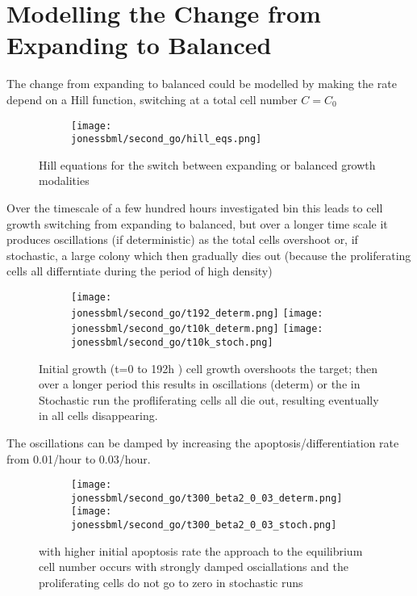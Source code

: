 \documentclass[a4paper,10pt]{report}
\newcommand{\psortbase}{/home/ngrs2/work/bsu/PSORT_Zuliani_Reynolds/}
\newcommand{\sbmlbase}{\psortbase/sbml-sh/}
\newcommand{\jonessbml}{\sbmlbase/jones_like}
\begin{document}
\section{Modelling the Change from Expanding to Balanced}

The change from expanding to balanced could be modelled by making the rate
depend on a Hill function, switching at a total cell number $C=C_0$

\begin{figure}[h!]
  \begin{subfigure}{\textwidth}
    \texttt{[image: \\jonessbml/second\_go/hill\_eqs.png]}
  \end{subfigure}
  \caption{Hill equations for the switch between expanding or balanced growth modalities}
  \label{fig:joneslike_hilleq}
\end{figure}

Over the timescale of a few hundred hours investigated bin \cite{roshan2016human} this leads to cell growth switching from expanding to balanced, but over a longer time scale it produces oscillations (if deterministic)  as the total cells overshoot or, if stochastic, a large colony which then gradually dies out (because the proliferating cells all differntiate during the period of high density)

\begin{figure}[h!]
  \begin{subfigure}{\textwidth}
    \texttt{[image: \\jonessbml/second\_go/t192\_determ.png]}
    \texttt{[image: \\jonessbml/second\_go/t10k\_determ.png]}
    \texttt{[image: \\jonessbml/second\_go/t10k\_stoch.png]}
  \end{subfigure}
  \caption{Initial growth (t=0 to 192h ) cell growth overshoots the target; then over a longer period this results in oscillations (determ) or the  in Stochastic run the profliferating cells all die out, resulting eventually in all cells disappearing.}
  \label{fig:joneslike_hill_oscill}
\end{figure}

The oscillations can be damped by increasing the apoptosis/differentiation rate
from 0.01/hour to 0.03/hour.

\begin{figure}[h!]
  \begin{subfigure}{\textwidth}
    \texttt{[image: \\jonessbml/second\_go/t300\_beta2\_0\_03\_determ.png]}
    \texttt{[image: \\jonessbml/second\_go/t300\_beta2\_0\_03\_stoch.png]}
  \end{subfigure}
  \caption{with higher initial apoptosis rate the approach to the equilibrium cell number occurs with strongly damped osciallations and the proliferating cells do not go to zero in stochastic runs}
  \label{fig:joneslike_hill_damped_oscill}
\end{figure}
\end{document}
